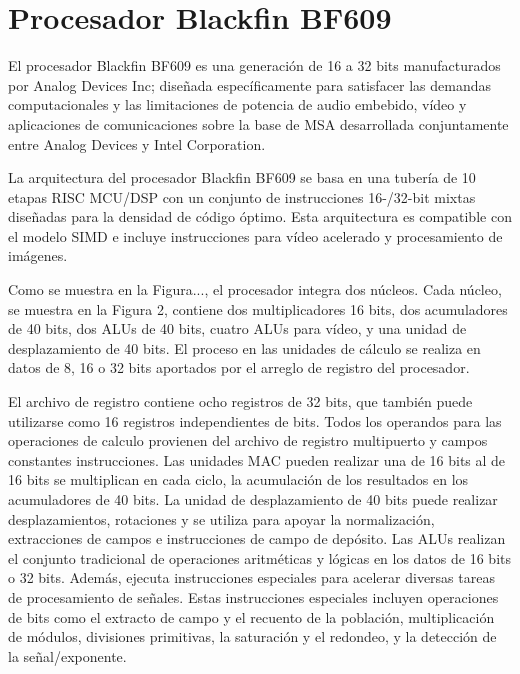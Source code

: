 
\section{Procesador Blackfin BF609}

El procesador Blackfin BF609 es una generación de 16 a 32 bits manufacturados por Analog Devices Inc; diseñada
específicamente para satisfacer las demandas computacionales y las limitaciones de potencia de audio embebido, vídeo y
aplicaciones de comunicaciones sobre la base de MSA desarrollada conjuntamente entre Analog Devices y Intel
Corporation. 

La arquitectura del procesador Blackfin BF609 se basa en una tubería de 10 etapas RISC MCU/DSP con un conjunto de
instrucciones 16-/32-bit mixtas diseñadas para la densidad de código óptimo. Esta arquitectura es compatible con el
modelo SIMD\cite{Lawson1992} e incluye instrucciones para vídeo acelerado y procesamiento de imágenes.  


Como se muestra en la Figura..., el procesador integra dos núcleos. Cada núcleo, se muestra en la Figura 2, contiene dos
multiplicadores 16 bits, dos acumuladores de 40 bits, dos ALUs  de 40 bits, cuatro ALUs para vídeo, y una unidad de
desplazamiento de 40 bits. El proceso en las unidades de cálculo se realiza en datos de 8, 16 o 32 bits aportados por el
arreglo de registro del procesador.

El archivo de registro contiene ocho registros de 32 bits, que también puede utilizarse como 16 registros independientes
de bits. Todos los operandos para las operaciones de calculo provienen del archivo de registro multipuerto y campos
constantes instrucciones. Las unidades MAC pueden realizar una de 16 bits al de 16 bits se multiplican en cada ciclo, la
acumulación de los resultados en los acumuladores de 40 bits. La unidad de desplazamiento de 40 bits puede realizar
desplazamientos, rotaciones y se utiliza para apoyar la normalización, extracciones de campos e instrucciones de campo de
depósito. Las ALUs realizan el conjunto tradicional de operaciones aritméticas y lógicas en los datos de 16 bits o 32
bits. Además, ejecuta instrucciones especiales para acelerar diversas tareas de procesamiento de señales. Estas
instrucciones especiales incluyen operaciones de bits como el extracto de campo y el recuento de la población,
multiplicación de módulos, divisiones primitivas, la saturación y el redondeo, y la 
detección de la señal/exponente.

